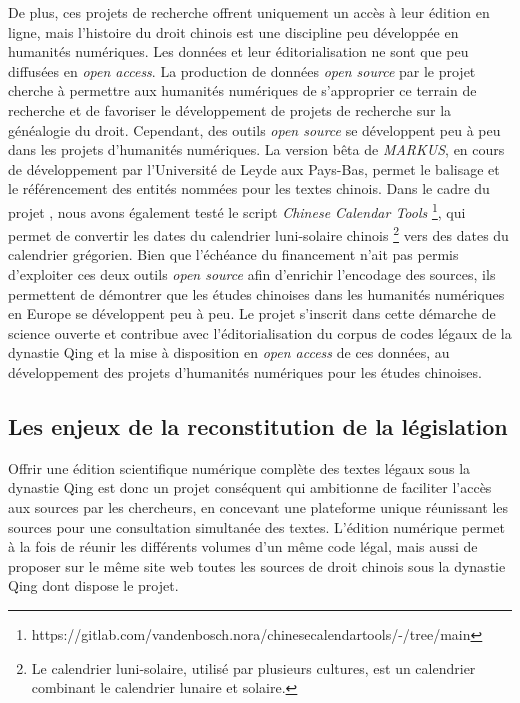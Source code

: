 De plus, ces projets de recherche offrent uniquement un accès à leur édition en ligne, mais l'histoire du droit chinois est une discipline peu développée en humanités numériques. Les données et leur éditorialisation ne sont que peu diffusées en \textit{open access}. La production de données \textit{open source} par le projet \COREL cherche à permettre aux humanités numériques de s'approprier ce terrain de recherche et de favoriser le développement de projets de recherche sur la généalogie du droit. Cependant, des outils \textit{open source} se développent peu à peu dans les projets d'humanités numériques. La version bêta de \textit{MARKUS}, en cours de développement par l'Université de Leyde aux Pays-Bas, permet le balisage et le référencement des entités nommées pour les textes chinois. Dans le cadre du projet \COREL, nous avons également testé le script \textit{Chinese Calendar Tools} \footnote{https://gitlab.com/vandenbosch.nora/chinesecalendartools/-/tree/main}, qui permet de convertir les dates du calendrier luni-solaire chinois \footnote{Le calendrier luni-solaire, utilisé par plusieurs cultures, est un calendrier combinant le calendrier lunaire et solaire.} vers des dates du calendrier grégorien. Bien que l'échéance du financement n'ait pas permis d'exploiter ces deux outils \textit{open source} afin d'enrichir l'encodage des sources, ils permettent de démontrer que les études chinoises dans les humanités numériques en Europe se développent peu à peu. Le projet \COREL s'inscrit dans cette démarche de science ouverte et contribue avec l'éditorialisation du corpus de codes légaux de la dynastie Qing et la mise à disposition en \textit{open access} de ces données, au développement des projets d'humanités numériques pour les études chinoises. 

\subsection{Les enjeux de la reconstitution de la législation}

Offrir une édition scientifique numérique complète des textes légaux sous la dynastie Qing est donc un projet conséquent qui ambitionne de faciliter l'accès aux sources par les chercheurs, en concevant une plateforme unique réunissant les sources pour une consultation simultanée des textes. L'édition numérique permet à la fois de réunir les différents volumes d'un même code légal, mais aussi de proposer sur le même site web toutes les sources de droit chinois sous la dynastie Qing dont dispose le projet.

